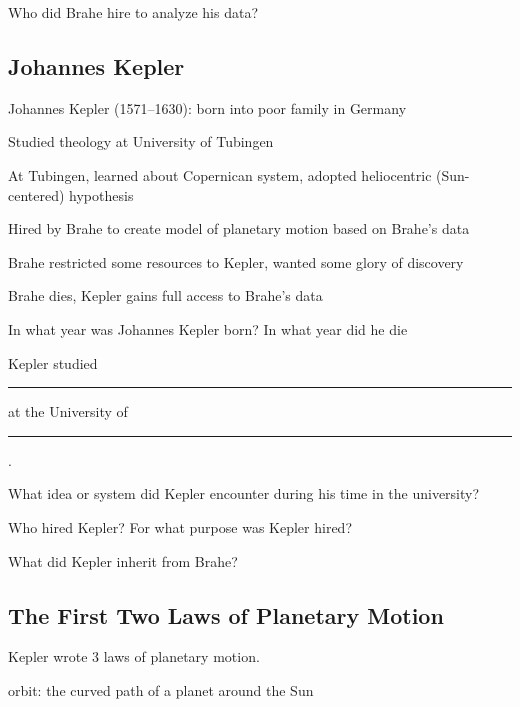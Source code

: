 \documentclass{article}
\begin{document}
\begin{problem}
    Who did Brahe hire to analyze his data?
\end{problem}

\subsection*{Johannes Kepler}

Johannes Kepler (1571--1630): born into poor family in Germany

Studied theology at University of Tubingen

At Tubingen, learned about Copernican system, adopted heliocentric (Sun-centered) hypothesis 

Hired by Brahe to create model of planetary motion based on Brahe's data

Brahe restricted some resources to Kepler, wanted some glory of discovery

Brahe dies, Kepler gains full access to Brahe's data

\begin{problem}
    In what year was Johannes Kepler born? In what year did he die
\end{problem}

\begin{problem}
    Kepler studied \rule{2cm}{0.15mm} at the University of \rule{2cm}{0.15mm} .
\end{problem}

\begin{problem}
    What idea or system did Kepler encounter during his time in the university?
\end{problem}

\begin{problem}
    Who hired Kepler? For what purpose was Kepler hired?
\end{problem}

\begin{problem}
    What did Kepler inherit from Brahe?
\end{problem}

\clearpage

\subsection*{The First Two Laws of Planetary Motion}

Kepler wrote 3 laws of planetary motion.

orbit: the curved path of a planet around the Sun
\end{document}
